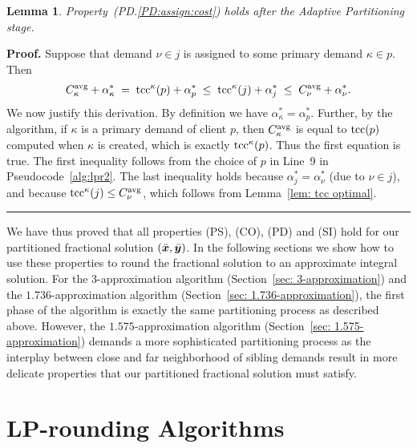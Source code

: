 \documentclass[oneside,final]{ucr}
\newtheorem{lemma}[theorem]{Lemma}
\newenvironment{proof}[1][Proof]{\textbf{#1.} }{\ \rule{0.5em}{0.5em}}
\begin{document}

\begin{lemma}\label{lem: PD:assign:cost holds}
Property~(PD.\ref{PD:assign:cost}) holds after the Adaptive Partitioning stage.
\end{lemma}
\begin{proof}
Suppose that demand $\nu\in j$ is assigned to some primary demand $\kappa\in p$.
Then
%
\begin{eqnarray*}
 C^{{\mbox{\scriptsize\rm avg}}}_{\kappa} + \alpha_{\kappa}^\ast \;=\; \mbox{\rm{tcc}}^{\kappa}(p) + \alpha^\ast_p
 					\;\le\; \mbox{\rm{tcc}}^{\kappa}(j) + \alpha^\ast_j   
					\;\le\; C^{{\mbox{\scriptsize\rm avg}}}_{\nu} + \alpha^\ast_\nu.
\end{eqnarray*}
%
We now justify this derivation. By definition we have
$\alpha_{\kappa}^\ast = \alpha^\ast_p$.  Further, by the
algorithm, if $\kappa$ is a primary demand of client $p$,
then $C^{{\mbox{\scriptsize\rm avg}}}_{\kappa}$ is equal to $\mbox{\rm{tcc}}(p)$ computed when
$\kappa$ is created, which is exactly $\mbox{\rm{tcc}}^{\kappa}(p)$. Thus
the first equation is true. The first inequality follows
from the choice of $p$ in Line~9 in
Pseudocode~\ref{alg:lpr2}. The last inequality holds
because $\alpha^\ast_j = \alpha^\ast_\nu$ (due to $\nu\in
j$), and because $\mbox{\rm{tcc}}^{\kappa}(j) \le C^{{\mbox{\scriptsize\rm avg}}}_{\nu}$, which
follows from Lemma~\ref{lem: tcc optimal}.
\end{proof}

We have thus proved that all properties (PS), (CO), (PD) and (SI) hold
for our partitioned fractional solution $(\bar{\boldsymbol{x}},\bar{\boldsymbol{y}})$. In the
following sections we show how to use these properties to round the
fractional solution to an approximate integral solution. For the
$3$-approximation algorithm (Section~\ref{sec: 3-approximation}) and
the $1.736$-approximation algorithm (Section~\ref{sec:
  1.736-approximation}), the first phase of the algorithm is exactly
the same partitioning process as described above. However, the
$1.575$-approximation algorithm (Section~\ref{sec:
  1.575-approximation}) demands a more sophisticated partitioning
process as the interplay between close and far neighborhood of sibling
demands result in more delicate properties that our partitioned
fractional solution must satisfy.

\chapter{LP-rounding Algorithms} \label{ch: lp-rounding}
\end{document}
